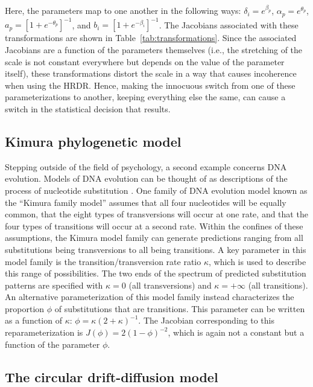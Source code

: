 \documentclass[9pt,twocolumn,twoside]{cidlab-draft}\templatetype{cidlab-invited}
\newcommand{\hdr}{HRDR}
\begin{document}
Here, the parameters map to one another in the following ways: $\delta_i = e^{\beta_p}$, $\alpha_p = e^{\theta_p}$, $a_p      = \left[1+e^{-\theta_p}\right]^{-1}$, and $b_i = \left[1+e^{-\beta_i}\right]^{-1}$.
The Jacobians associated with these transformations are shown in Table~\ref{tab:transformations}.  Since the associated Jacobians are a function of the parameters themselves (i.e., the stretching of the scale is not constant everywhere but depends on the value of the parameter itself), these transformations distort the scale in a way that causes incoherence when using the \hdr{}.  Hence, making the innocuous switch from one of these parameterizations to another, keeping everything else the same, can cause a switch in the statistical decision that results.

\subsection*{Kimura phylogenetic model}

Stepping outside of the field of psychology, a second example concerns DNA evolution.  Models of DNA evolution can be thought of as descriptions of the process of nucleotide substitution \cite{Zwickl2004}. One family of DNA evolution model known as the ``Kimura family model'' assumes that  all four nucleotides will be equally common, that the eight types of transversions will occur at one rate, and that the four types of transitions will occur at a second rate. Within the confines of these assumptions, the Kimura model family can generate predictions ranging from all substitutions being transversions to all being transitions.  A key parameter in this model family is the transition/transversion rate ratio $\kappa$, which is used to describe this range of possibilities. The two ends of the spectrum of predicted substitution patterns are specified with $\kappa = 0$ (all transversions) and $\kappa = +\infty$ (all transitions).  An alternative parameterization of this model family instead characterizes the proportion $\phi$ of substitutions that are transitions.  This parameter can be written as a function of $\kappa$: $\phi = \kappa (2 + \kappa)^{-1}$.  The Jacobian corresponding to this reparameterization is $J(\phi) = 2(1 - \phi)^{-2}$, which is again not a constant but a function of the parameter $\phi$.

\subsection*{The circular drift-diffusion model}
\end{document}
